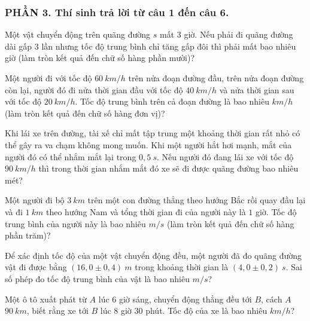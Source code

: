\subsubsection*{PHẦN 3. Thí sinh trả lời từ câu 1 đến câu 6.}
\setcounter{ex}{0}
\begin{ex}%
Một vật chuyển động trên quãng đường $s$ mất $3$ giờ. Nếu phải đi quãng đường dài gấp $3$ lần nhưng tốc độ trung bình chỉ tăng gấp đôi thì phải mất bao nhiêu giờ (làm tròn kết quả đến chữ số hàng phần mười)?
\loigiai{
}
\end{ex}
\begin{ex}%
Một người đi với tốc độ $60\ km/h$ trên nửa đoạn đường đầu, trên nửa đoạn đường còn lại, người đó đi nửa thời gian đầu với tốc độ $40\ km/h$ và nửa thời gian sau với tốc độ $20\ km/h$. Tốc độ trung bình trên cả đoạn đường là bao nhiêu $km/h$ (làm tròn kết quả đến chữ số hàng đơn vị)?
\loigiai{
}
\end{ex}
\begin{ex}%
Khi lái xe trên đường, tài xế chỉ mất tập trung một khoảng thời gian rất nhỏ có thể gây ra va chạm không mong muốn. Khi một người hắt hơi mạnh, mắt của người đó có thể nhắm mắt lại trong $0,5\ s$. Nếu người đó đang lái xe với tốc độ $90\ km/h$ thì trong thời gian nhắm mắt đó xe sẽ đi được quãng đường bao nhiêu mét?
\loigiai{
}
\end{ex}
\begin{ex}%
Một người đi bộ $3\ km$ trên một con đường thẳng theo hướng Bắc rồi quay đầu lại và đi $1\ km$ theo hướng Nam và tổng thời gian đi của người này là $1$ giờ. Tốc độ trung bình của người này là bao nhiêu $m/s$ (làm tròn kết quả đến chữ số hàng phần trăm)?
\loigiai{
}
\end{ex}
\begin{ex}%
Để xác định tốc độ của một vật chuyển động đều, một người đã đo quãng đường vật đi được bằng $(16,0 \pm 0,4)\ m$ trong khoảng thời gian là $(4,0 \pm 0,2)\ s$. Sai số phép đo tốc độ trung bình của vật là bao nhiêu $m/s$?
\loigiai{
}
\end{ex}
\begin{ex}%
Một ô tô xuất phát từ $A$ lúc $6$ giờ sáng, chuyển động thẳng đều tới $B$, cách $A$ $90\ km$, biết rằng xe tới $B$ lúc $8$ giờ $30$ phút. Tốc độ của xe là bao nhiêu $km/h$?
\loigiai{
}
\end{ex}




